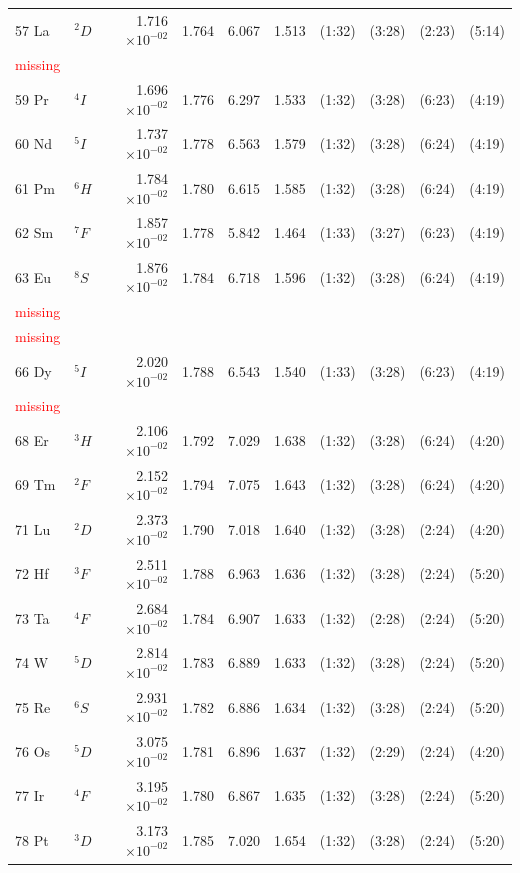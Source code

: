\documentclass[12pt]{report}
\newcommand{\notetodylan}[1]{\textcolor{red}{#1}} %
\begin{document}
\begin{longtable}{l l r r r r r r r r}
57 La & $^{2}D$ & 1.716$\times10^{-02}$ & 1.764 & 6.067 & 1.513 & (1:32) & (3:28) & (2:23) & (5:14) \\
\notetodylan{missing}	\\
59 Pr & $^{4}I$ & 1.696$\times10^{-02}$ & 1.776 & 6.297 & 1.533 & (1:32) & (3:28) & (6:23) & (4:19) \\
60 Nd & $^{5}I$ & 1.737$\times10^{-02}$ & 1.778 & 6.563 & 1.579 & (1:32) & (3:28) & (6:24) & (4:19) \\
61 Pm & $^{6}H$ & 1.784$\times10^{-02}$ & 1.780 & 6.615 & 1.585 & (1:32) & (3:28) & (6:24) & (4:19) \\
62 Sm & $^{7}F$ & 1.857$\times10^{-02}$ & 1.778 & 5.842 & 1.464 & (1:33) & (3:27) & (6:23) & (4:19) \\
63 Eu & $^{8}S$ & 1.876$\times10^{-02}$ & 1.784 & 6.718 & 1.596 & (1:32) & (3:28) & (6:24) & (4:19) \\
\notetodylan{missing}	\\
\notetodylan{missing}	\\
66 Dy & $^{5}I$ & 2.020$\times10^{-02}$ & 1.788 & 6.543 & 1.540 & (1:33) & (3:28) & (6:23) & (4:19) \\
\notetodylan{missing}	\\
68 Er & $^{3}H$ & 2.106$\times10^{-02}$ & 1.792 & 7.029 & 1.638 & (1:32) & (3:28) & (6:24) & (4:20) \\
69 Tm & $^{2}F$ & 2.152$\times10^{-02}$ & 1.794 & 7.075 & 1.643 & (1:32) & (3:28) & (6:24) & (4:20) \\
71 Lu & $^{2}D$ & 2.373$\times10^{-02}$ & 1.790 & 7.018 & 1.640 & (1:32) & (3:28) & (2:24) & (4:20) \\
72 Hf & $^{3}F$ & 2.511$\times10^{-02}$ & 1.788 & 6.963 & 1.636 & (1:32) & (3:28) & (2:24) & (5:20) \\
73 Ta & $^{4}F$ & 2.684$\times10^{-02}$ & 1.784 & 6.907 & 1.633 & (1:32) & (2:28) & (2:24) & (5:20) \\
74 W & $^{5}D$ & 2.814$\times10^{-02}$ & 1.783 & 6.889 & 1.633 & (1:32) & (3:28) & (2:24) & (5:20) \\
75 Re & $^{6}S$ & 2.931$\times10^{-02}$ & 1.782 & 6.886 & 1.634 & (1:32) & (3:28) & (2:24) & (5:20) \\
76 Os & $^{5}D$ & 3.075$\times10^{-02}$ & 1.781 & 6.896 & 1.637 & (1:32) & (2:29) & (2:24) & (4:20) \\
77 Ir & $^{4}F$ & 3.195$\times10^{-02}$ & 1.780 & 6.867 & 1.635 & (1:32) & (3:28) & (2:24) & (5:20) \\
78 Pt & $^{3}D$ & 3.173$\times10^{-02}$ & 1.785 & 7.020 & 1.654 & (1:32) & (3:28) & (2:24) & (5:20) \\

\end{longtable}
\end{document}
